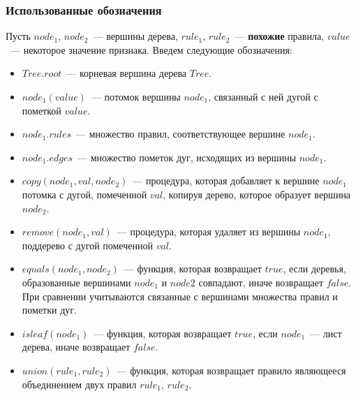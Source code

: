 \documentclass[oneside,final,12pt]{extarticle}
\begin{document}
           \subsubsection{Использованные обозначения}
                Пусть \(node_1\), \(node_2\)~--- вершины дерева, \(rule_1\), \(rule_2\)~--- \textbf{похожие} правила, \(value\)~--- некоторое значение признака. Введем следующие обозначения:
                \begin{itemize}
                    \item \(Tree.root\)~--- корневая вершина дерева \(Tree\).
                    \item \(node_1(value)\)~--- потомок вершины \(node_1\), связанный с ней дугой с пометкой \(value\).
                    \item \(node_1.rules\)~--- множество правил, соответствующее вершине \(node_1\).
                    \item \(node_1.edges\)~--- множество пометок дуг, исходящих из вершины \(node_1\).
                    \item \(copy(node_1, val, node_2)\)~--- процедура, которая добавляет к вершине \(node_1\) потомка с дугой, помеченной \(val\), копируя дерево, которое образует вершина \(node_2\).
                    \item \(remove(node_1, val)\)~--- процедура, которая удаляет из вершины \(node_1\), поддерево с дугой помеченной \(val\). 
                    \item \(equals(node_1, node_2)\)~--- функция, которая возвращает \(true\), если деревья, образованные вершинами \(node_1\) и \(node2\) совпадают, иначе возвращает \(false\). При сравнении учитываются связанные с вершинами множества правил и пометки дуг.
                    \item \(isleaf(node_1)\)~--- функция, которая возвращает \(true\), если \(node_1\)~--- лист дерева, иначе возвращает \(false\).
                    \item \(union(rule_1, rule_2)\)~--- функция, которая возвращает правило являющееся объединением двух правил \(rule_1\), \(rule_2\).
                \end{itemize}
\end{document}
